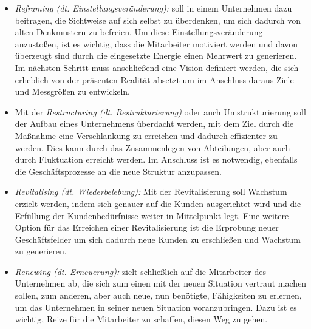 \begin{itemize}
    \item[] \emph{Reframing (dt. Einstellungsveränderung):} soll in einem Unternehmen dazu beitragen, die Sichtweise auf sich selbst zu überdenken, um sich dadurch von alten Denkmustern zu befreien. Um diese Einstellungsveränderung anzustoßen, ist es wichtig, dass die Mitarbeiter motiviert werden und davon überzeugt sind durch die eingesetzte Energie einen Mehrwert zu generieren. Im nächsten Schritt muss anschließend eine Vision definiert werden, die sich erheblich von der präsenten Realität absetzt um im Anschluss daraus Ziele und Messgrößen zu entwickeln. 
    \item[] Mit der \emph{Restructuring (dt. Restrukturierung)} oder auch Umstrukturierung soll der Aufbau eines Unternehmens überdacht werden, mit dem Ziel durch die Maßnahme eine Verschlankung zu erreichen und dadurch effizienter zu werden. Dies kann durch das Zusammenlegen von Abteilungen, aber auch durch Fluktuation erreicht werden. Im Anschluss ist es notwendig, ebenfalls die Geschäftsprozesse an die neue Struktur anzupassen.   
    \item[] \emph{Revitalising (dt. Wiederbelebung):} Mit der Revitalisierung soll Wachstum erzielt werden, indem sich genauer auf die Kunden ausgerichtet wird und die Erfüllung der Kundenbedürfnisse weiter in Mittelpunkt legt. Eine weitere Option für das Erreichen einer Revitalisierung ist die Erprobung neuer Geschäftsfelder um sich dadurch neue Kunden zu erschließen und Wachstum zu generieren.
    \item[] \emph{Renewing (dt. Erneuerung):} zielt schließlich auf die Mitarbeiter des Unternehmen ab, die sich zum einen mit der neuen Situation vertraut machen sollen, zum anderen, aber auch neue, nun benötigte, Fähigkeiten zu erlernen, um das Unternehmen in seiner neuen Situation voranzubringen. Dazu ist es wichtig, Reize für die Mitarbeiter zu schaffen, diesen Weg zu gehen.
\end{itemize}

